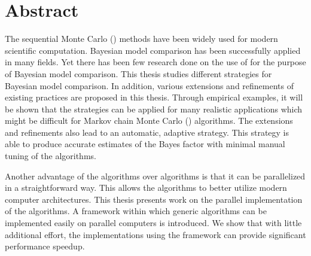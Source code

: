 \chapter*{Abstract}

The sequential Monte Carlo (\smc) methods have been widely used for modern
scientific computation. Bayesian model comparison has been successfully
applied in many fields. Yet there has been few research done on the use of
\smc for the purpose of Bayesian model comparison. This thesis studies
different \smc strategies for Bayesian model comparison. In addition, various
extensions and refinements of existing \smc practices are proposed in this
thesis. Through empirical examples, it will be shown that the \smc strategies
can be applied for many realistic applications which might be difficult for
Markov chain Monte Carlo (\mcmc) algorithms. The extensions and refinements
also lead to an automatic, adaptive strategy. This strategy is able to produce
accurate estimates of the Bayes factor with minimal manual tuning of the
algorithms.

Another advantage of the \smc algorithms over \mcmc algorithms is that it can
be parallelized in a straightforward way. This allows the algorithms to better
utilize modern computer architectures. This thesis presents work on the
parallel implementation of the \smc algorithms. A \cpp framework within which
generic \smc algorithms can be implemented easily on parallel computers is
introduced. We show that with little additional effort, the implementations
using the framework can provide significant performance speedup.
